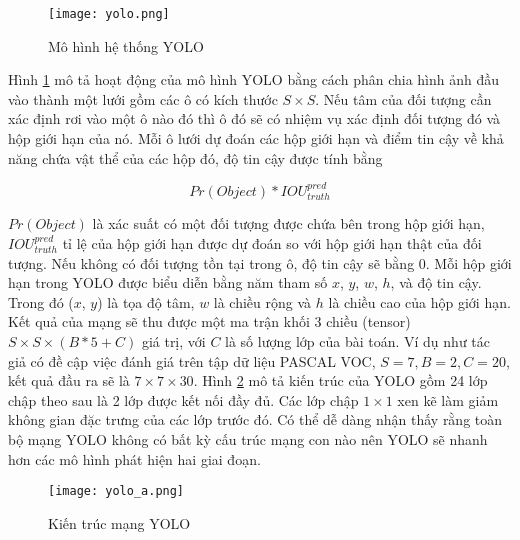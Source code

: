 \documentclass[../the.tex]{subfiles}
\begin{document}
\begin{figure}[H]
	\centering
	\texttt{[image: yolo.png]}
	\caption{Mô hình hệ thống YOLO}
	\label{fig:yolo}
\end{figure}

{\fontsize{13}{12} \selectfont

Hình \ref{fig:yolo} mô tả hoạt động của mô hình YOLO bằng cách phân chia hình ảnh đầu vào thành một lưới gồm các ô có kích thước
$S \times S$. Nếu tâm của đối tượng cần xác định rơi vào một ô nào đó thì ô đó sẽ có nhiệm vụ xác định đối tượng đó và hộp giới hạn của nó.
Mỗi ô lưới dự đoán các hộp giới hạn và điểm tin cậy về khả năng chứa vật thể của các hộp đó, độ tin cậy được tính bằng

\begin{equation}
	Pr(Object) * IOU^{pred}_{truth}
\end{equation}

$Pr(Object)$ là xác suất có một đối tượng được chứa bên trong hộp giới hạn, $IOU^{pred}_{truth}$ tỉ lệ của hộp giới hạn được dự đoán so với hộp giới hạn thật của đối tượng.
Nếu không có đối tượng tồn tại trong ô, độ tin cậy sẽ bằng 0. Mỗi hộp giới hạn trong YOLO được biểu diễn bằng năm tham số
$x$, $y$, $w$, $h$, và độ tin cậy. Trong đó ($x$, $y$) là tọa độ tâm, $w$ là chiều rộng và $h$ là chiều cao của hộp giới hạn.
Kết quả của mạng sẽ thu được một ma trận khối 3 chiều (tensor)  $S \times S \times (B * 5 + C)$ giá trị, với
$C$ là số lượng lớp của bài toán. Ví dụ như tác giả có đề cập việc đánh giá trên tập dữ liệu PASCAL VOC, $S = 7, B = 2, C = 20$, kết quả đầu ra sẽ là $7 \times 7 \times 30$.
Hình \ref{fig:mangyolo} mô tả kiến trúc của YOLO gồm 24 lớp chập theo sau là 2 lớp được kết nối đầy đủ. Các lớp chập $1 \times 1$ xen kẽ làm giảm không gian đặc trưng của các lớp trước đó.
Có thể dễ dàng nhận thấy rằng toàn bộ mạng YOLO không có bất kỳ cấu trúc mạng con nào nên YOLO sẽ nhanh hơn các mô hình phát hiện hai giai đoạn.

}

\begin{figure}[H]
	\centering
	\texttt{[image: yolo\_a.png]}
	\caption{Kiến trúc mạng YOLO}
	\label{fig:mangyolo}
\end{figure}
\bigskip


\end{document}
